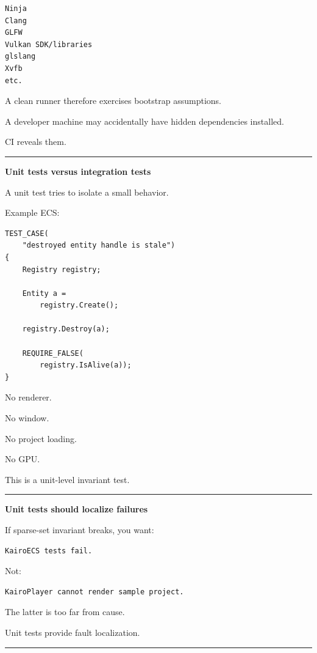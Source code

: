 \begin{verbatim}
Ninja
Clang
GLFW
Vulkan SDK/libraries
glslang
Xvfb
etc.
\end{verbatim}

A clean runner therefore exercises bootstrap assumptions.

A developer machine may accidentally have hidden dependencies installed.

CI reveals them.

\begin{center}\rule{0.5\linewidth}{0.5pt}\end{center}

\textbf{Unit tests versus integration tests}

A unit test tries to isolate a small behavior.

Example ECS:

\begin{verbatim}
TEST_CASE(
    "destroyed entity handle is stale")
{
    Registry registry;

    Entity a =
        registry.Create();

    registry.Destroy(a);

    REQUIRE_FALSE(
        registry.IsAlive(a));
}
\end{verbatim}

No renderer.

No window.

No project loading.

No GPU.

This is a unit-level invariant test.

\begin{center}\rule{0.5\linewidth}{0.5pt}\end{center}

\textbf{Unit tests should localize failures}

If sparse-set invariant breaks, you want:

\begin{verbatim}
KairoECS tests fail.
\end{verbatim}

Not:

\begin{verbatim}
KairoPlayer cannot render sample project.
\end{verbatim}

The latter is too far from cause.

Unit tests provide fault localization.

\begin{center}\rule{0.5\linewidth}{0.5pt}\end{center}

